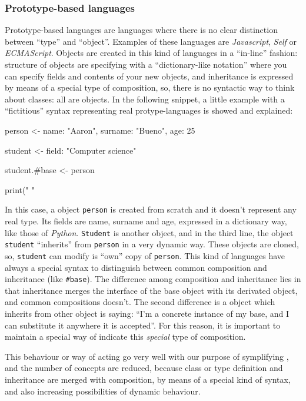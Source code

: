 \documentclass{article}
\begin{document}
\subsubsection{Prototype-based languages}
Prototype-based languages are languages where there is no clear distinction
between ``type'' and ``object''. Examples of these languages are
\textit{Javascript}, \textit{Self} or \textit{ECMAScript}. Objects are created
in this kind of languages in a ``in-line'' fashion: structure of objects are
specifying with a ``dictionary-like notation'' where you can specify fields and
contents of your new objects, and inheritance is expressed by means of a special
type of composition, so, there is no syntactic way to think about classes: all
are objects. In the following snippet, a little example with a ``fictitious''
syntax representing real protype-languages is showed and explained:

\begin{Python}
  person <- {name: "Aaron", surname: "Bueno", age: 25}

  student <- {field: "Computer science"}

  student.#base <- person

  print("%
        "%
\end{Python}

In this case, a object \texttt{person} is created from scratch and it doesn't
represent any real type. Its fields are name, surname and age, expressed in a
dictionary way, like those of \textit{Python}. \texttt{Student} is another
object, and in the third line, the object \texttt{student} ``inherits'' from
\texttt{person} in a very dynamic way. These objects are cloned, so,
\texttt{student} can modify is ``own'' copy of \texttt{person}. This kind of
languages have always a special syntax to distinguish between common composition
and inheritance (like \texttt{\#base}). The difference among composition and
inheritance lies in that inheritance merges the interface of the base object
with its derivated object, and common compositions doesn't. The second
difference is a object which inherits from other object is saying: ``I'm a
concrete instance of my base, and I can substitute it anywhere it is
accepted''. For this reason, it is important to maintain a special way of
indicate this \textit{special} type of composition.

This behaviour or way of acting go very well with our purpose of symplifying
\faupp, and the number of concepts are reduced, because class or type definition
and inheritance are merged with composition, by means of a special kind of
syntax, and also increasing possibilities of dynamic behaviour.
\end{document}

